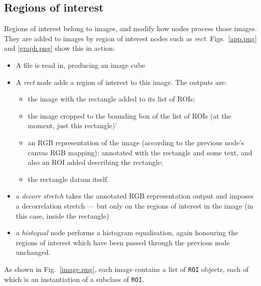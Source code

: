 \subsection{Regions of interest}
Regions of interest belong to images, and modify how nodes process those images. They are added to 
images by region of interest nodes such as \emph{rect}. Figs.~\ref{app.png} and \ref{graph.png}
show this in action:
\begin{itemize}
\item A file is read in, producing an image cube
\item A \emph{rect} node adds a region of interest to this image. The outputs are:
\begin{itemize}
\item the image with the rectangle added to its list of ROIs;
\item the image cropped to the bounding box of the list of ROIs (at the moment, just this rectangle)'
\item an RGB representation of the image (according to the previous node's canvas RGB mapping);
annotated with the rectangle and some text, and also an ROI added describing the rectangle;
\item the rectangle datum itself.
\end{itemize}
\item a \emph{decorr stretch} takes the annotated RGB representation output and imposes a decorrelation
stretch --- but only on the regions of interest in the image (in this case, inside the rectangle)
\item a \emph{histequal} node performs a histogram equalisation, again honouring the regions of interest
which have been passed through the previous node unchanged.
\end{itemize}
As shown in Fig.~\ref{image.png}, each image contains a list of \texttt{ROI} objects,
each of which is an instantiation of a subclass of \texttt{ROI}. 

